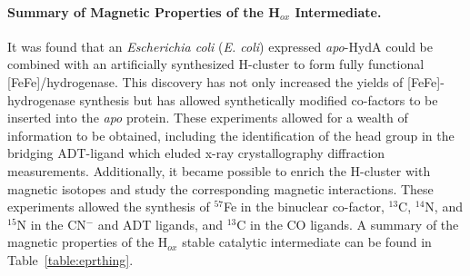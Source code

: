 \paragraph{Summary of Magnetic Properties of the H$_{ox}$ Intermediate.} It was found that an \textit{Escherichia coli} (\textit{E. coli}) expressed \textit{apo}-HydA could be combined with an artificially synthesized H-cluster to form fully functional [FeFe]\-/hydrogenase. \cite{EsselbornArtificial, BirrellArtificial} This discovery has not only increased the yields of [FeFe]-hydrogenase synthesis but has allowed synthetically modified co-factors to be inserted into the \textit{apo} protein. These experiments allowed for a wealth of information to be obtained, including the identification of the head group in the bridging ADT-ligand which eluded x-ray crystallography diffraction measurements. \cite{AdamskaBridgingAmine} Additionally, it became possible to enrich the H-cluster with magnetic isotopes and study the corresponding magnetic interactions. These experiments allowed the synthesis of $^{57}$Fe in the binuclear co-factor, $^{13}$C, $^{14}$N, and $^{15}$N in the CN$^-$ and ADT ligands, and $^{13}$C in the CO ligands. A summary of the magnetic properties of the H$_{ox}$ stable catalytic intermediate can be found in Table~\ref{table:eprthing}. 

